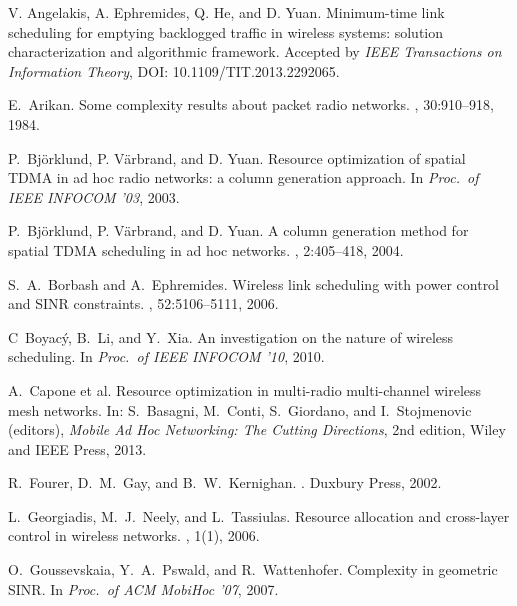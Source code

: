 \documentclass[10pt,onecolumn,journal,draftcls,oneside]{IEEEtran}
\begin{document}
\begin{thebibliography}{1}


V. Angelakis, A. Ephremides, Q. He, and D. Yuan.
\newblock Minimum-time link scheduling for emptying backlogged traffic in wireless systems: solution characterization and algorithmic framework.
\newblock Accepted by {\em IEEE Transactions on Information Theory}, DOI: 10.1109/TIT.2013.2292065.


E.~Arikan.
\newblock Some complexity results about packet radio networks.
, 30:910--918, 1984.

P.~Bj{\"o}rklund, P. V{\"a}rbrand, and D. Yuan.
\newblock Resource optimization of spatial TDMA in ad hoc radio networks: a column generation approach.
\newblock In {\em Proc.\ of IEEE INFOCOM '03}, 2003.

P.~Bj{\"o}rklund, P. V{\"a}rbrand, and D. Yuan.
\newblock A column generation method for spatial TDMA scheduling in ad hoc networks.
, 2:405--418, 2004.

S.~A.~Borbash and A.~Ephremides.
\newblock Wireless link scheduling with power control and SINR constraints.
, 52:5106--5111, 2006.

C~Boyac{\'y}, B.~Li, and Y.~Xia.
\newblock An investigation on the nature of wireless scheduling.
\newblock In {\em Proc.\ of IEEE INFOCOM '10}, 2010.

A.~Capone et al.
\newblock Resource optimization in multi-radio multi-channel wireless mesh networks.
\newblock In: S.~Basagni, M.~Conti, S.~Giordano, and I.~Stojmenovic (editors),
{\em Mobile Ad Hoc Networking: The Cutting Directions}, 2nd edition,
Wiley and IEEE Press, 2013.

R.~Fourer, D.~M.~Gay, and B.~W.~Kernighan.
. Duxbury Press, 2002.

L.~Georgiadis, M.~J.~Neely, and L.~Tassiulas.
\newblock Resource allocation and cross-layer control in wireless networks.
, 1(1), 2006.

O.~Goussevskaia, Y.~A.~Pswald, and R.~Wattenhofer.
\newblock Complexity in geometric SINR.
\newblock In {\em Proc.\ of ACM MobiHoc '07}, 2007.


\end{thebibliography}
\end{document}
